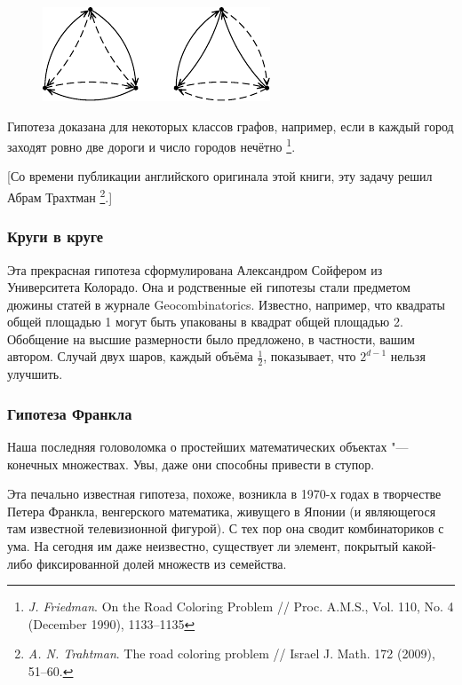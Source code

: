 \documentclass[twoside]{book}
\begin{document}
\begin{figure}[!ht]
\centering
\includegraphics{mp/wink-33}
\end{figure}

Гипотеза доказана для некоторых классов графов, например, если в каждый город заходят ровно две дороги и число городов нечётно%
\footnote{\emph{J. Friedman}. On the Road Coloring Problem /\!/ {Proc. A.M.S.}, Vol. 110, No. 4 (December 1990), 1133--1135}.

[Со времени публикации английского оригинала этой книги, эту задачу решил Абрам Трахтман%
\footnote{\emph{A. N. Trahtman}. The road coloring problem /\!/ {Israel J. Math.} 172 (2009), 51--60.}.]


\subsubsection*{Круги в круге}

Эта прекрасная гипотеза сформулирована Александром Сойфером из Университета  Колорадо.
Она и родственные ей гипотезы стали предметом дюжины статей в журнале \change{}{<<}Geo\-com\-bi\-na\-tor\-ics\change{}{>>}.
Известно, например, что квадраты общей площадью 1 могут быть упакованы в квадрат общей площадью 2.
Обобщение на высшие размерности было предложено, в частности, вашим автором.
Случай двух шаров, каждый объёма $\tfrac12$, показывает, что $2^{d-1}$ нельзя улучшить.

\subsubsection*{Гипотеза Франкла}

Наша последняя головоломка о простейших математических объектах "--- конечных множествах.
Увы, даже они способны привести в ступор.

Эта печально известная гипотеза, похоже, возникла в 1970-х годах в творчестве Петера Франкла, венгерского математика, живущего в Японии (и являющегося там известной телевизионной фигурой).
С тех пор она сводит комбинаториков с ума. 
На сегодня им даже неизвестно, существует ли элемент, покрытый какой-либо фиксированной долей множеств из семейства.
\end{document}
